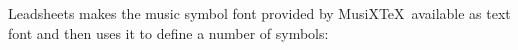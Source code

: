 \documentclass{article}
\begin{document}
Leadsheets makes the music symbol font provided by MusiX\TeX\
available as text font and then uses it to define a number
of symbols:
\sharp\ \doublesharp\ \flat\ \doubleflat\ \natural\
\trebleclef\ \altoclef\ \bassclef\ \meterC\ \allabreve\
\ \wholerest\ \halfrest\ \quarterrest\
\eighthrest\ \sixteenthrest\ \Break\ \normalbar\
\leftrepeat\ \rightrepeat\ \leftrightrepeat\ \doublebar\
\stopbar
\end{document}
